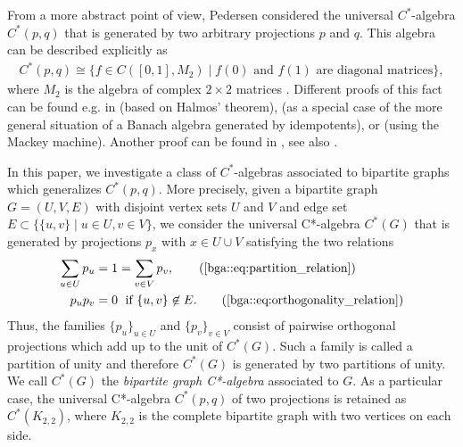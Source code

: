 \documentclass[a4paper]{amsart}
\begin{document}
From a more abstract point of view, Pedersen considered the universal $C^\ast$-algebra $C^\ast(p,q)$ that is generated by two arbitrary projections $p$ and $q$. This algebra can be described explicitly as
\begin{align*}
    C^*(p,q) \cong \{ f \in C([0,1], M_2) \mid f(0) \text{ and } f(1) \text{ are diagonal matrices} \},
\end{align*}
where $M_2$ is the algebra of complex $2 \times 2$ matrices \cite{pedersen_measure_1968}.
Different proofs of this fact can be found e.g. in \cite{power_hankel_1982} (based on Halmos' theorem), \cite{roch_algebras_1988} (as a special case of the more general situation of a Banach algebra generated by idempotents), or \cite{raeburn_c-algebra_1989} (using the Mackey machine). Another proof can be found in \cite{vasilevski_algebra_1981}, see also \cite{bottcher_gentle_2010}.

In this paper, we investigate a class of $C^\ast$-algebras associated to bipartite graphs which generalizes $C^\ast(p,q)$. More precisely, given a bipartite graph $G = (U, V, E)$ with disjoint vertex sets $U$ and $V$ and edge set $E \subset \{\{u,v\} \mid u \in U, v \in V\}$, we consider the universal C*-algebra $C^\ast(G)$ that is generated by projections $p_x$ with $x \in U \cup V$ satisfying the two relations
\begin{align}
    \sum_{u \in U} p_u &= 1 = \sum_{v \in V} p_v,        \tag{\ref{bga::eq:partition_relation}} \\
    p_u p_v &= 0 \; \text{ if } \{u, v\} \not \in E.  \tag{\ref{bga::eq:orthogonality_relation}}
\end{align}
Thus, the families $\{p_u\}_{u \in U}$ and $\{p_v\}_{v \in V}$ consist of pairwise orthogonal projections which add up to the unit of $C^\ast(G)$. Such a family is called a partition of unity and therefore $C^\ast(G)$ is generated by two partitions of unity. We call $C^\ast(G)$ the \emph{bipartite graph C*-algebra} associated to $G$. As a particular case, the universal C*-algebra $C^\ast(p,q)$ of two projections is retained as $C^\ast(K_{2,2})$, where $K_{2,2}$ is the complete bipartite graph with two vertices on each side.
\end{document}

